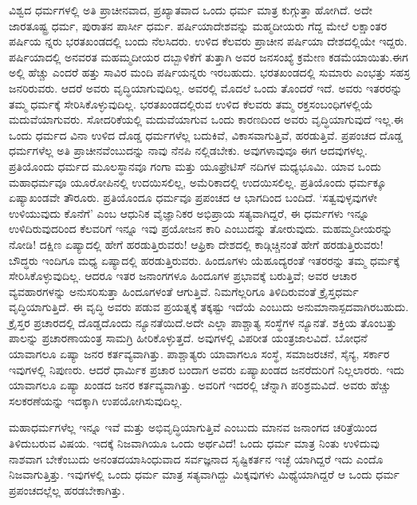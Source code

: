 ವಿಶ್ವದ ಧರ್ಮಗಳಲ್ಲಿ ಅತಿ ಪ್ರಾಚೀನವಾದ, ಪ್ರಖ್ಯಾತವಾದ ಒಂದು ಧರ್ಮ ಮಾತ್ರ ಕುಗ್ಗುತ್ತಾ ಹೋಗಿದೆ. ಅದೇ ಜಾರತೂಷ್ಟ್ರ ಧರ್ಮ, ಪುರಾತನ ಪಾರ್ಸೀ ಧರ್ಮ. ಪರ್ಷಿಯಾದೇಶವನ್ನು ಮಹ್ಮದೀಯರು ಗೆದ್ದ ಮೇಲೆ ಲಕ್ಷಾಂತರ ಪರ್ಷಿಯ ನ್ನರು ಭರತಖಂಡದಲ್ಲಿ ಬಂದು ನೆಲಸಿದರು. ಉಳಿದ ಕೆಲವರು ಪ್ರಾಚೀನ ಪರ್ಷಿಯಾ ದೇಶದಲ್ಲಿಯೇ ಇದ್ದರು. ಪರ್ಷಿಯಾದಲ್ಲಿ ಅನವರತ ಮಹಮ್ಮದೀಯರ ದಬ್ಬಾಳಿಕೆಗೆ ತುತ್ತಾಗಿ ಅವರ ಜನಸಂಖ್ಯೆ ಕ್ರಮೇಣ ಕಡಮೆಯಾಯಿತು.ಈಗ ಅಲ್ಲಿ ಹೆಚ್ಚು ಎಂದರೆ ಹತ್ತು ಸಾವಿರ ಮಂದಿ ಪರ್ಷಿಯನ್ನರು ಇರಬಹುದು. ಭರತಖಂಡದಲ್ಲಿ ಸುಮಾರು ಎಂಭತ್ತು ಸಹಸ್ರ ಜನರಿರುವರು. ಆದರೆ ಅವರು ವೃದ್ಧಿಯಾಗುವುದಿಲ್ಲ. ಅವರಲ್ಲಿ ಮೊದಲೆ ಒಂದು ತೊಂದರೆ ಇದೆ. ಅವರು ಇತರರನ್ನು ತಮ್ಮ ಧರ್ಮಕ್ಕೆ ಸೇರಿಸಿಕೊಳ್ಳುವುದಿಲ್ಲ. ಭರತಖಂಡದಲ್ಲಿರುವ ಉಳಿದ ಕೆಲವರು ತಮ್ಮ ರಕ್ತಸಂಬಂಧಿಗಳಲ್ಲಿಯೆ ಮದುವೆಯಾಗುವರು. ಸೋದರಿಕೆಯಲ್ಲಿ ಮದುವೆಯಾಗುವ ಒಂದು ಕಾರಣದಿಂದ ಅವರು ವೃದ್ಧಿಯಾಗುವುದೆ ಇಲ್ಲ.ಈ ಒಂದು ಧರ್ಮದ ವಿನಾ ಉಳಿದ ದೊಡ್ಡ ಧರ್ಮಗಳೆಲ್ಲ ಬದುಕಿವೆ, ವಿಕಾಸವಾಗುತ್ತಿವೆ, ಹರಡುತ್ತಿವೆ. ಪ್ರಪಂಚದ ದೊಡ್ಡ ಧರ್ಮಗಳೆಲ್ಲ ಅತಿ ಪ್ರಾಚೀನವೆಂಬುದನ್ನು ನಾವು ನೆನಪಿ ನಲ್ಲಿಡಬೇಕು. ಅವುಗಳಾವುವೂ ಈಗ ಆದವುಗಳಲ್ಲ. ಪ್ರತಿಯೊಂದು ಧರ್ಮದ ಮೂಲಸ್ಥಾನವೂ ಗಂಗಾ ಮತ್ತು ಯೂಫ್ರೇಟಿಸ್​ ನದಿಗಳ ಮಧ್ಯಭೂಮಿ. ಯಾವ ಒಂದು ಮಹಾಧರ್ಮವೂ ಯೂರೋಪಿನಲ್ಲಿ ಉದಯಿಸಲಿಲ್ಲ, ಅಮೆರಿಕಾದಲ್ಲಿ ಉದಯಿಸಲಿಲ್ಲ. ಪ್ರತಿಯೊಂದು ಧರ್ಮಕ್ಕೂ ಏಷ್ಯಾಖಂಡವೇ ತೌರೂರು. ಪ್ರತಿಯೊಂದೂ ಧರ್ಮವೂ ಪ್ರಪಂಚದ ಆ ಭಾಗದಿಂದ ಬಂದಿದೆ. ‘ಸತ್ವವುಳ್ಳವುಗಳೇ ಉಳಿಯುವುದು ಕೊನೆಗೆ’ ಎಂಬ ಆಧುನಿಕ ವೈಜ್ಞಾನಿಕರ ಅಭಿಪ್ರಾಯ ಸತ್ಯವಾಗಿದ್ದರೆ, ಈ ಧರ್ಮಗಳು ಇನ್ನೂ ಉಳಿದಿರುವುದರಿಂದ ಕೆಲವರಿಗೆ ಇನ್ನೂ ಇವು ಪ್ರಯೋಜನ ಕಾರಿ ಎಂಬುದನ್ನು ತೋರುವುದು. ಮಹಮ್ಮದೀಯರನ್ನು ನೋಡಿ! ದಕ್ಷಿಣ ಏಷ್ಯಾದಲ್ಲಿ ಹೇಗೆ ಹರಡುತ್ತಿರುವರು! ಆಫ್ರಿಕಾ ದೇಶದಲ್ಲಿ ಕಾಡ್ಗಿಚ್ಚಿನಂತೆ ಹೇಗೆ ಹರಡುತ್ತಿರುವರು! ಬೌದ್ಧರು ಇಂದಿಗೂ ಮಧ್ಯ ಏಷ್ಯಾದಲ್ಲಿ ಹರಡುತ್ತಿರುವರು. ಹಿಂದೂಗಳು ಯೆಹೂದ್ಯರಂತೆ ಇತರರನ್ನು ತಮ್ಮ ಧರ್ಮಕ್ಕೆ ಸೇರಿಸಿಕೊಳ್ಳುವುದಿಲ್ಲ. ಆದರೂ ಇತರ ಜನಾಂಗಗಳೂ ಹಿಂದೂಗಳ ಪ್ರಭಾವಕ್ಕೆ ಬರುತ್ತಿವೆ; ಅವರ ಆಚಾರ ವ್ಯವಹಾರಗಳನ್ನು ಅನುಸರಿಸುತ್ತಾ ಹಿಂದೂಗಳಂತೆ ಆಗುತ್ತಿವೆ. ನಿಮಗೆಲ್ಲರಿಗೂ ತಿಳಿದಿರುವಂತೆ ಕ್ರೈಸ್ತಧರ್ಮ ವೃದ್ಧಿಯಾಗುತ್ತಿದೆ. ಈ ವೃದ್ಧಿ ಅವರು ಪಡುವ ಪ್ರಯತ್ನಕ್ಕೆ ತಕ್ಕಷ್ಟು ಇದೆಯೆ ಎಂಬುದು ಅನುಮಾನಾಸ್ಪದವಾಗಿರಬಹುದು. ಕ್ರೈಸ್ತರ ಪ್ರಚಾರದಲ್ಲಿ ದೊಡ್ಡದೊಂದು ನ್ಯೂನತೆಯಿದೆ.ಅದೇ ಎಲ್ಲಾ ಪಾಶ್ಚಾತ್ಯ ಸಂಸ್ಥೆಗಳ ನ್ಯೂನತೆ. ಶಕ್ತಿಯ ತೊಂಬತ್ತು ಪಾಲನ್ನು ಪ್ರಚಾರಣಾಯಂತ್ರ ಸಾಮಗ್ರಿ ಹೀರಿಕೊಳ್ಳುತ್ತದೆ. ಅವುಗಳಲ್ಲಿ ವಿಪರೀತ ಯಂತ್ರಜಾಲವಿದೆ. ಬೋಧನೆ ಯಾವಾಗಲೂ ಏಷ್ಯಾ ಜನರ ಕರ್ತವ್ಯವಾಗಿತ್ತು. ಪಾಶ್ಚಾತ್ಯರು ಯಾವಾಗಲೂ ಸಂಸ್ಥೆ, ಸಮಾಜರಚನೆ, ಸೈನ್ಯ, ಸರ್ಕಾರ ಇವುಗಳಲ್ಲಿ ನಿಪುಣರು. ಆದರೆ ಧಾರ್ಮಿಕ ಪ್ರಚಾರ ಬಂದಾಗ ಅವರು ಏಷ್ಯಾಖಂಡದ ಜನರೆದುರಿಗೆ ನಿಲ್ಲಲಾರರು. ಇದು ಯಾವಾಗಲೂ ಏಷ್ಯಾ ಖಂಡದ ಜನರ ಕರ್ತವ್ಯವಾಗಿತ್ತು. ಅವರಿಗೆ ಇದರಲ್ಲಿ ಚೆನ್ನಾಗಿ ಪರಿಶ್ರಮವಿದೆ. ಅವರು ಹೆಚ್ಚು ಸಲಕರಣೆಯನ್ನು ಇದಕ್ಕಾಗಿ ಉಪಯೋಗಿಸುವುದಿಲ್ಲ.

ಮಹಾಧರ್ಮಗಳೆಲ್ಲ ಇನ್ನೂ ಇವೆ ಮತ್ತು ಅಭಿವೃದ್ಧಿಯಾಗುತ್ತಿವೆ ಎಂಬುದು ಮಾನವ ಜನಾಂಗದ ಚರಿತ್ರೆಯಿಂದ ತಿಳಿದುಬರುವ ವಿಷಯ. ಇದಕ್ಕೆ ನಿಜವಾಗಿಯೂ ಒಂದು ಅರ್ಥವಿದೆ! ಒಂದು ಧರ್ಮ ಮಾತ್ರ ನಿಂತು ಉಳಿದುವು ನಾಶವಾಗ ಬೇಕೆಂಬುದು ಅನಂತದಯಾಸಿಂಧುವಾದ ಸರ್ವಜ್ಞನಾದ ಸೃಷ್ಟಿಕರ್ತನ ಇಚ್ಛೆ ಯಾಗಿದ್ದರೆ ಇದು ಎಂದೊ ನಿಜವಾಗುತ್ತಿತ್ತು. ಇವುಗಳಲ್ಲಿ ಒಂದು ಧರ್ಮ ಮಾತ್ರ ಸತ್ಯವಾಗಿದ್ದು ಮಿಕ್ಕವುಗಳು ಮಿಥ್ಯೆಯಾಗಿದ್ದರೆ ಆ ಒಂದು ಧರ್ಮ ಪ್ರಪಂಚದಲ್ಲೆಲ್ಲ ಹರಡಬೇಕಾಗಿತ್ತು.

